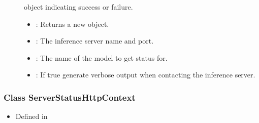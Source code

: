 \documentclass[letterpaper,10pt,english]{sphinxmanual}
\begin{document}
\begin{fulllineitems}
\begin{fulllineitems}
\begin{description}
\item[{}] \leavevmode
{\hyperref[\detokenize{cpp_api/classnvidia_1_1inferenceserver_1_1client_1_1Error:classnvidia_1_1inferenceserver_1_1client_1_1Error}]{}} object indicating success or failure. 

\item[{}] \leavevmode\begin{itemize}
\item {} 
: Returns a new {\hyperref[\detokenize{cpp_api/classnvidia_1_1inferenceserver_1_1client_1_1ServerStatusGrpcContext:classnvidia_1_1inferenceserver_1_1client_1_1ServerStatusGrpcContext}]{}} object. 

\item {} 
: The inference server name and port. 

\item {} 
: The name of the model to get status for. 

\item {} 
: If true generate verbose output when contacting the inference server. 

\end{itemize}

\end{description}


\end{fulllineitems}


\end{fulllineitems}



\subsubsection{Class ServerStatusHttpContext}
\label{\detokenize{cpp_api/classnvidia_1_1inferenceserver_1_1client_1_1ServerStatusHttpContext:class-serverstatushttpcontext}}\label{\detokenize{cpp_api/classnvidia_1_1inferenceserver_1_1client_1_1ServerStatusHttpContext:exhale-class-classnvidia-1-1inferenceserver-1-1client-1-1serverstatushttpcontext}}\label{\detokenize{cpp_api/classnvidia_1_1inferenceserver_1_1client_1_1ServerStatusHttpContext::doc}}\begin{itemize}
\item {} 
Defined in {\hyperref[\detokenize{cpp_api/file_src_clients_c++_request.h:file-src-clients-c-request-h}]{}}

\end{itemize}
\end{document}
